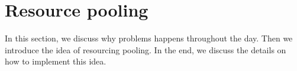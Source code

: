 \section{Resource pooling}

In this section, we discuss why problems happens throughout the day. Then we introduce the idea of resourcing pooling. In the end, we discuss the details on how to implement this idea.





